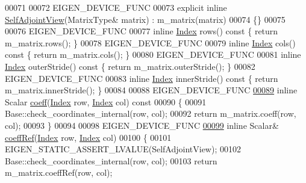 \begin{DoxyCode}
00071 
00072     EIGEN\_DEVICE\_FUNC
00073     \textcolor{keyword}{explicit} \textcolor{keyword}{inline} \hyperlink{group___core___module_class_eigen_1_1_self_adjoint_view}{SelfAdjointView}(MatrixType& matrix) : m\_matrix(matrix)
00074     \{\}
00075 
00076     EIGEN\_DEVICE\_FUNC
00077     \textcolor{keyword}{inline} \hyperlink{group___core___module_a554f30542cc2316add4b1ea0a492ff02}{Index} rows()\textcolor{keyword}{ const }\{ \textcolor{keywordflow}{return} m\_matrix.rows(); \}
00078     EIGEN\_DEVICE\_FUNC
00079     \textcolor{keyword}{inline} \hyperlink{group___core___module_a554f30542cc2316add4b1ea0a492ff02}{Index} cols()\textcolor{keyword}{ const }\{ \textcolor{keywordflow}{return} m\_matrix.cols(); \}
00080     EIGEN\_DEVICE\_FUNC
00081     \textcolor{keyword}{inline} \hyperlink{group___core___module_a554f30542cc2316add4b1ea0a492ff02}{Index} outerStride()\textcolor{keyword}{ const }\{ \textcolor{keywordflow}{return} m\_matrix.outerStride(); \}
00082     EIGEN\_DEVICE\_FUNC
00083     \textcolor{keyword}{inline} \hyperlink{group___core___module_a554f30542cc2316add4b1ea0a492ff02}{Index} innerStride()\textcolor{keyword}{ const }\{ \textcolor{keywordflow}{return} m\_matrix.innerStride(); \}
00084 
00088     EIGEN\_DEVICE\_FUNC
\hyperlink{group___core___module_ad49cb2f908a2069cbacf9836b9bd6b84}{00089}     \textcolor{keyword}{inline} Scalar \hyperlink{group___core___module_ad49cb2f908a2069cbacf9836b9bd6b84}{coeff}(\hyperlink{group___core___module_a554f30542cc2316add4b1ea0a492ff02}{Index} row, \hyperlink{group___core___module_a554f30542cc2316add4b1ea0a492ff02}{Index} col)\textcolor{keyword}{ const}
00090 \textcolor{keyword}{    }\{
00091       Base::check\_coordinates\_internal(row, col);
00092       \textcolor{keywordflow}{return} m\_matrix.coeff(row, col);
00093     \}
00094 
00098     EIGEN\_DEVICE\_FUNC
\hyperlink{group___core___module_a1f0c389753a56b97bbb26dcab820f111}{00099}     \textcolor{keyword}{inline} Scalar& \hyperlink{group___core___module_a1f0c389753a56b97bbb26dcab820f111}{coeffRef}(\hyperlink{group___core___module_a554f30542cc2316add4b1ea0a492ff02}{Index} row, \hyperlink{group___core___module_a554f30542cc2316add4b1ea0a492ff02}{Index} col)
00100     \{
00101       EIGEN\_STATIC\_ASSERT\_LVALUE(SelfAdjointView);
00102       Base::check\_coordinates\_internal(row, col);
00103       \textcolor{keywordflow}{return} m\_matrix.coeffRef(row, col);

\end{DoxyCode}
